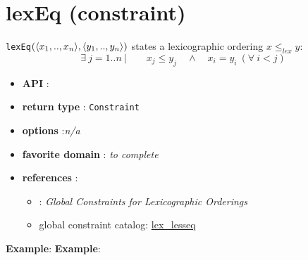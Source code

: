 \label{lexeq}
\hypertarget{lexeq}{}

\section{lexEq (constraint)}\label{lexeq:lexeqconstraint}\hypertarget{lexeq:lexeqconstraint}{}
\begin{notedef}
  \texttt{lexEq}$(\langle x_1,..,x_n\rangle,\langle y_1,..,y_n\rangle)$ states a lexicographic ordering  $x \le_{lex} y$:
$$\exists\ j=1..n\ |\qquad x_j\le y_j\quad \land\quad x_i=y_i\ (\forall\  i<j)$$
\end{notedef}

\begin{itemize}
	\item \textbf{API} : 
	\item \textbf{return type} : \texttt{Constraint}
	\item \textbf{options} :\emph{n/a}
	\item \textbf{favorite domain} : \emph{to complete}
	\item \textbf{references} :
      \begin{itemize}
      \item \cite{FrischCP02}: \emph{Global Constraints for Lexicographic Orderings}
      \item global constraint catalog: \href{http://www.emn.fr/x-info/sdemasse/gccat/Clex_lesseq.html}{lex\_lesseq}
      \end{itemize}
\end{itemize}

\textbf{Example}:
\textbf{Example}:


